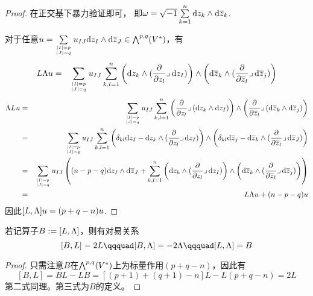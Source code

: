 \begin{proof}在正交基下暴力验证即可，
即$\omega=\sqrt{-1}\sum\limits_{k=1}^n\mathrm{d} z_k\wedge\mathrm{d}\overline{z}_k$.

对于任意$u=\sum\limits_{|I|=p\atop|J|=q}u_{IJ}
\mathrm{d} z_I\wedge\mathrm{d}\overline{z}_J\in\bigwedge\nolimits^{p,q}(V^*)$，有
\begin{eqnarray*}
     L\Lambda u
&=&
      \sum_{|I|=p\atop|J|=q}
       u_{IJ}\sum_{k,l=1}^{n}
         \left(
           \mathrm{d} z_k\wedge
           (\frac{\partial } {\partial z_l}\lrcorner\,\mathrm{d} z_I)
         \right)\wedge
         \left(
           \mathrm{d}\overline{z}_k\wedge
           (\frac{\partial } {\partial \overline{z}_l}\lrcorner\,\mathrm{d}\overline{z}_j)
         \right)
\end{eqnarray*}
\begin{eqnarray*}
     \Lambda Lu
&=&
      \sum_{|I|=p\atop|J|=q}
       u_{IJ}\sum_{k,l=1}^{n}
         \left(
           \frac{\partial } {\partial z_l}\lrcorner\,
           (\mathrm{d} z_k\wedge\mathrm{d} z_I)
         \right)\wedge
         \left(
           \frac{\partial } {\partial \overline{z}_l}\lrcorner\,
           (\mathrm{d}\overline{z}_k\wedge\mathrm{d}\overline{z}_j)
         \right)\\
&=&
      \sum_{|I|=p\atop|J|=q}
       u_{IJ}\sum_{k,l=1}^{n}
         \left(
           \delta_{kl}\mathrm{d} z_I
          -\mathrm{d} z_k\wedge(\frac{\partial } {\partial z_l}\lrcorner\,\mathrm{d} z_I)
         \right)\wedge
         \left(
           \delta_{kl}\mathrm{d}\overline{z}_j
          -\mathrm{d}\overline{z}_k\wedge(\frac{\partial } {\partial \overline{z}_l}\lrcorner\,\mathrm{d}\overline{z}_J)
         \right)\\
&=&
      \sum_{|I|=p\atop|J|=q}
       u_{IJ}
         \left(
           (n-p-q)\mathrm{d} z_I\wedge\mathrm{d}\overline{z}_J
          +\sum_{k,l=1}^{n}
         \left(
           \mathrm{d} z_k\wedge
           (\frac{\partial } {\partial z_l}\lrcorner\,\mathrm{d} z_I)
         \right)\wedge
         \left(
           \mathrm{d}\overline{z}_k\wedge
           (\frac{\partial } {\partial \overline{z}_l}\lrcorner\,\mathrm{d}\overline{z}_j)
         \right)
         \right)\\
&=&
     L\Lambda u
    +(n-p-q)u
\end{eqnarray*}
因此$[L,\Lambda]u=(p+q-n)u$.
\end{proof}

\begin{cor}若记算子$B:=[L,\Lambda]$，则有对易关系
$$
  [B,L]=2L\qqquad
  [B,\Lmd]=-2\Lmd\qqquad
  [L,\Lmd]=B
$$
\end{cor}

\begin{proof}
只需注意$B$在$\bigwedge\nolimits^{p,q}(V^*)$上为标量作用$(p+q-n)$，因此有
$$[B,L]=BL-LB=[(p+1)+(q+1)-n]L-L(p+q-n)=2L$$
第二式同理。第三式为$B$的定义。
\end{proof}


